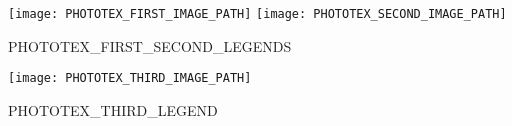 \begin{minipage}[t][0.025\textheight][t]{\textwidth}
  \hfill\vfill
\end{minipage}
\begin{minipage}[t][0.45\textheight][t]{\textwidth}
  \begin{center}
    \texttt{[image: PHOTOTEX\_FIRST\_IMAGE\_PATH]}\hspace{2em}
    \texttt{[image: PHOTOTEX\_SECOND\_IMAGE\_PATH]}\\[1em]
  \end{center}
\end{minipage}
\begin{minipage}[t][0.03\textheight][t]{\textwidth}
  \begin{center}
    PHOTOTEX_FIRST_SECOND_LEGENDS\\[1em]
  \end{center}
\end{minipage}
\begin{minipage}[t][0.45\textheight][t]{\textwidth}
  \begin{center}
    \texttt{[image: PHOTOTEX\_THIRD\_IMAGE\_PATH]}\\[1em]
  \end{center}
\end{minipage}
\begin{minipage}[t][0.03\textheight][t]{\textwidth}
  \begin{center}
    PHOTOTEX_THIRD_LEGEND\\[1em]
  \end{center}
\end{minipage}


